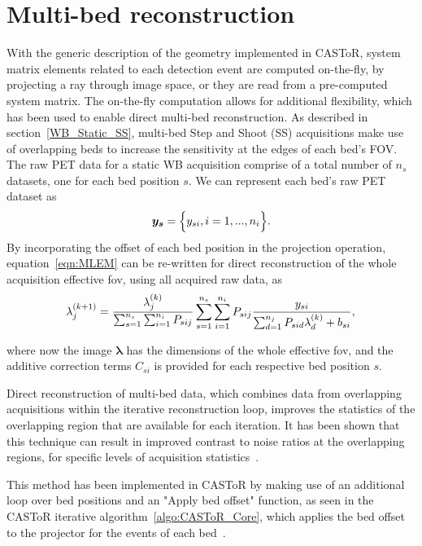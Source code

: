 \section{Multi-bed reconstruction}
\label{chap2_4:MultiBedRecon}
With the generic description of the geometry implemented in CASToR, system matrix elements related to each detection event are computed on-the-fly, by projecting a ray through image space, or they are read from a pre-computed system matrix. 
The on-the-fly computation allows for additional flexibility, which has been used to enable direct multi-bed reconstruction. 
As described in section~\ref{WB_Static_SS}, multi-bed Step and Shoot (SS) acquisitions make use of overlapping beds to increase the sensitivity at the edges of each bed's FOV. The raw PET data for a static WB acquisition comprise of a total number of $n_s$ datasets, one for each bed position $s$. We can represent each bed's raw PET dataset as
%
\begin{equation}
   \bm{y_s} = \Big\{ {y_{si},i=1,...,n_i} \Big\} \\ . \\
\end{equation}
%
%
By incorporating the offset of each bed position in the projection operation, equation~\ref{eqn:MLEM} can be re-written for direct reconstruction of the whole acquisition effective \gls{fov}, using all acquired raw data, as
\begin{equation}
\lambda_j^{(k+1)} = \frac{\lambda_j^{(k)}}{\sum_{s=1}^{n_s} \sum_{i=1}^{n_i} P_{sij}} 
\sum_{s=1}^{n_s} \sum_{i=1}^{n_i} P_{sij} 
\frac{y_{si}}{\sum_{d=1}^{n_j} P_{sid}\lambda_d^{(k)} + b_{si} } \\ , \\
\label{eqn2_4:MLEM_multibed}
\end{equation} 

where now the image $\bm{\lambda}$ has the dimensions of the whole effective \gls{fov}, and the additive correction terms $C_{si}$ is provided for each respective bed position $s$. 

Direct reconstruction of multi-bed data, which combines data from overlapping acquisitions within the iterative reconstruction loop, improves the statistics of the overlapping region that are available for each iteration. It has been shown that this technique can result in improved contrast to noise ratios at the overlapping regions, for specific levels of acquisition statistics~\cite{Ross2004}. 

This method has been implemented in CASToR by making use of an additional loop over bed positions and an "Apply bed offset" function, as seen in the CASToR iterative algorithm~\ref{algo:CASToR_Core}, which applies the bed offset to the projector for the events of each bed~\cite{Stute2014}.
